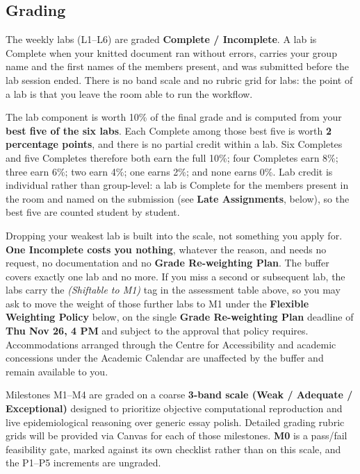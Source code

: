 \documentclass[
]{article}
\newcounter{none} %
\begin{document}
\subsection{Grading}\label{grading}

The weekly labs (L1--L6) are graded \textbf{Complete / Incomplete}. A
lab is Complete when your knitted document ran without errors, carries
your group name and the first names of the members present, and was
submitted before the lab session ended. There is no band scale and no
rubric grid for labs: the point of a lab is that you leave the room able
to run the workflow.

The lab component is worth 10\% of the final grade and is computed from
your \textbf{best five of the six labs}. Each Complete among those best
five is worth \textbf{2 percentage points}, and there is no partial
credit within a lab. Six Completes and five Completes therefore both
earn the full 10\%; four Completes earn 8\%; three earn 6\%; two earn
4\%; one earns 2\%; and none earns 0\%. Lab credit is individual rather
than group-level: a lab is Complete for the members present in the room
and named on the submission (see \textbf{Late Assignments}, below), so
the best five are counted student by student.

Dropping your weakest lab is built into the scale, not something you
apply for. \textbf{One Incomplete costs you nothing}, whatever the
reason, and needs no request, no documentation and no \textbf{Grade
Re-weighting Plan}. The buffer covers exactly one lab and no more. If
you miss a second or subsequent lab, the labs carry the \emph{(Shiftable
to M1)} tag in the assessment table above, so you may ask to move the
weight of those further labs to M1 under the \textbf{Flexible Weighting
Policy} below, on the single \textbf{Grade Re-weighting Plan} deadline
of \textbf{Thu Nov 26, 4 PM} and subject to the approval that policy
requires. Accommodations arranged through the Centre for Accessibility
and academic concessions under the Academic Calendar are unaffected by
the buffer and remain available to you.

Milestones M1--M4 are graded on a coarse \textbf{3-band scale (Weak /
Adequate / Exceptional)} designed to prioritize objective computational
reproduction and live epidemiological reasoning over generic essay
polish. Detailed grading rubric grids will be provided via Canvas for
each of those milestones. \textbf{M0} is a pass/fail feasibility gate,
marked against its own checklist rather than on this scale, and the
P1--P5 increments are ungraded.
\end{document}
